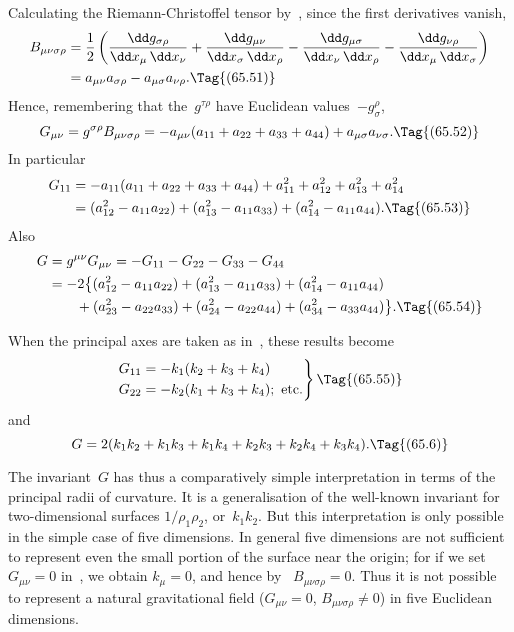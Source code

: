 \documentclass[12pt]{book}
\begin{document}
Calculating the Riemann-Christoffel tensor by~, since the first derivatives
vanish,
\begin{align*}
  B_{\mu\nu\sigma\rho}
  &= \frac{1}{2}\left(\frac{\dd g_{\sigma\rho}}{\dd x_{\mu}\, \dd x_{\nu}}
  + \frac{\dd g_{\mu\nu}}{\dd x_{\sigma}\, \dd x_{\rho}}
  - \frac{\dd g_{\mu\sigma}}{\dd x_{\nu}\, \dd x_{\rho}}
  - \frac{\dd g_{\nu\rho}}{\dd x_{\mu}\, \dd x_{\sigma}}\right) \\
  &= a_{\mu\nu} a_{\sigma\rho} - a_{\mu\sigma} a_{\nu\rho}.
  \Tag{(65.51)}
\end{align*}
Hence, remembering that the~$g^{\tau\rho}$ have Euclidean values~$-g_{\sigma}^{\rho}$,
\[
G_{\mu\nu} = g^{\sigma\rho} B_{\mu\nu\sigma\rho}
= -a_{\mu\nu} (a_{11} + a_{22} + a_{33} + a_{44}) + a_{\mu\sigma} a_{\nu\sigma}.
\Tag{(65.52)}
\]
In particular
\begin{align*}
  G_{11}
  &= -a_{11} (a_{11} + a_{22} + a_{33} + a_{44}) + a_{11}^{2} + a_{12}^{2} + a_{13}^{2} + a_{14}^{2} \\
  &= (a_{12}^{2} - a_{11} a_{22}) + (a_{13}^{2} - a_{11} a_{33}) + (a_{14}^{2} - a_{11} a_{44}).
  \Tag{(65.53)}
\end{align*}
Also
\begin{align*}
  G &= g^{\mu\nu} G_{\mu\nu}
  = -G_{11} - G_{22} - G_{33} - G_{44} \\
  &= -2 \bigl\{(a_{12}^{2} - a_{11} a_{22}) + (a_{13}^{2} - a_{11} a_{33}) + (a_{14}^{2} - a_{11} a_{44}) \\
  &\qquad + (a_{23}^{2} - a_{22} a_{33}) + (a_{24}^{2} - a_{22} a_{44}) + (a_{34}^{2} - a_{33} a_{44})\bigr\}.
  \Tag{(65.54)}
\end{align*}

When the principal axes are taken as in~, these results become
\[
\left.
\begin{aligned}
  G_{11} &= -k_{1}(k_{2} + k_{3} + k_{4})\\
  G_{22} &= -k_{2}(k_{1} + k_{3} + k_{4});\ \text{etc.}
\end{aligned}
\right\}
\Tag{(65.55)}
\]
and
\[
G = 2(k_{1}k_{2} + k_{1}k_{3} + k_{1} k_{4} + k_{2} k_{3} + k_{2} k_{4} + k_{3} k_{4}).
\Tag{(65.6)}
\]

The invariant~$G$ has thus a comparatively simple interpretation in terms
of the principal radii of curvature. It is a generalisation of the well-known
%
%
invariant for two-dimensional surfaces $1/\rho_{1}\rho_{2}$, or~$k_{1} k_{2}$. But this interpretation
is only possible in the simple case of five dimensions. In general five dimensions
are not sufficient to represent even the small portion of the surface near the
origin; for if we set $G_{\mu\nu} = 0$ in~, we obtain $k_{\mu} = 0$, and hence by~
$B_{\mu\nu\sigma\rho} = 0$. Thus it is not possible to represent a natural gravitational field
($G_{\mu\nu} = 0$, $B_{\mu\nu\sigma\rho} \neq 0$) in five Euclidean dimensions.
\end{document}
